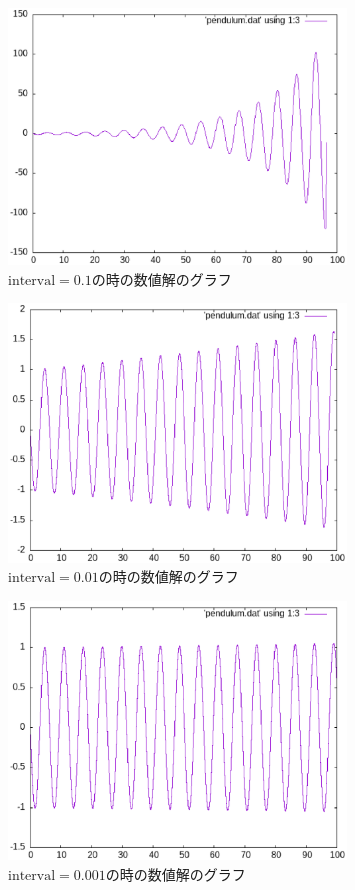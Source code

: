 \documentclass[a4paper]{jsarticle}
\begin{document}
\begin{figure}[H]
  \centering
  \includegraphics[width=0.8\textwidth]{pictures/pendulum1.eps}
  \caption{\(\text{interval} = 0.1\)の時の数値解のグラフ}
  \label{figure_pendulum1}
\end{figure}

\begin{figure}[H]
  \centering
  \includegraphics[width=0.8\textwidth]{pictures/pendulum2.eps}
  \caption{\(\text{interval} = 0.01\)の時の数値解のグラフ}
  \label{figure_pendulum2}
\end{figure}

\begin{figure}[H]
  \centering
  \includegraphics[width=0.8\textwidth]{pictures/pendulum3.eps}
  \caption{\(\text{interval} = 0.001\)の時の数値解のグラフ}
  \label{figure_pendulum3}
\end{figure}
\end{document}
